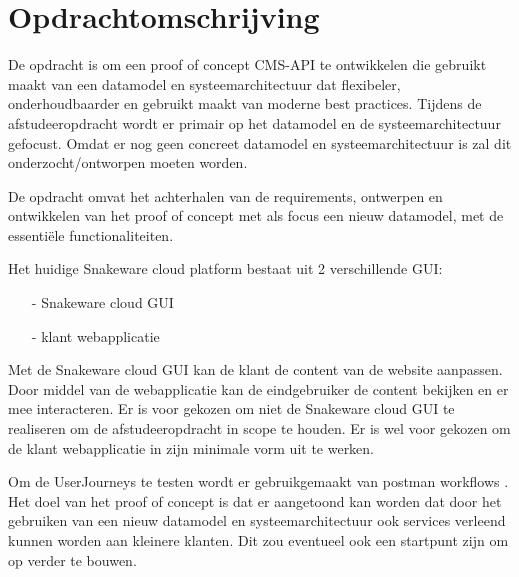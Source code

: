 \section{Opdrachtomschrijving}
\label{sec:Opdrachtomschrijving}
De opdracht is om een proof of concept CMS-API te ontwikkelen die gebruikt maakt van een datamodel en systeemarchitectuur dat flexibeler, onderhoudbaarder en gebruikt maakt van moderne best practices.
Tijdens de afstudeeropdracht wordt er primair op het datamodel en de systeemarchitectuur gefocust.
Omdat er nog geen concreet datamodel en systeemarchitectuur is zal dit onderzocht/ontworpen moeten worden.

\whitespace[2]
De opdracht omvat het achterhalen van de requirements, ontwerpen en ontwikkelen van het proof of concept met als focus een nieuw datamodel, met de essentiële functionaliteiten.

\whitespace[2]
Het huidige Snakeware cloud platform bestaat uit 2 verschillende \gls{GUI}:
\begin{itemize}
	\item[-] Snakeware cloud \gls{GUI}
	\item[-] klant webapplicatie
\end{itemize}

\whitespace
Met de Snakeware cloud \gls{GUI} kan de klant de content van de website aanpassen.
Door middel van de webapplicatie kan de eindgebruiker de content bekijken en er mee interacteren.
Er is voor gekozen om niet de Snakeware cloud \gls{GUI} te realiseren om de afstudeeropdracht in scope te houden.
Er is wel voor gekozen om de klant webapplicatie in zijn minimale vorm uit te werken.

\whitespace[2]
Om de \gls{UserJourneys} te testen wordt er gebruikgemaakt van postman workflows \Parencite{PostmanWorkflows}.
Het doel van het proof of concept is dat er aangetoond kan worden dat door het gebruiken van een nieuw datamodel en systeemarchitectuur ook services verleend kunnen worden aan kleinere klanten.
Dit zou eventueel ook een startpunt zijn om op verder te bouwen.


